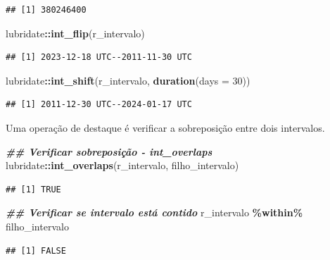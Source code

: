 \documentclass[
]{article}
\newenvironment{Shaded}{\begin{snugshade}}{\end{snugshade}}
\newcommand{\AttributeTok}[1]{\textcolor[rgb]{0.13,0.29,0.53}{#1}}
\newcommand{\DecValTok}[1]{\textcolor[rgb]{0.00,0.00,0.81}{#1}}
\newcommand{\DocumentationTok}[1]{\textcolor[rgb]{0.56,0.35,0.01}{\textbf{\textit{#1}}}}
\newcommand{\FunctionTok}[1]{\textcolor[rgb]{0.13,0.29,0.53}{\textbf{#1}}}
\newcommand{\NormalTok}[1]{#1}
\newcommand{\SpecialCharTok}[1]{\textcolor[rgb]{0.81,0.36,0.00}{\textbf{#1}}}
\begin{document}
\begin{verbatim}
## [1] 380246400
\end{verbatim}

\begin{Shaded}
\begin{Highlighting}[]
\NormalTok{lubridate}\SpecialCharTok{::}\FunctionTok{int\_flip}\NormalTok{(r\_intervalo)}
\end{Highlighting}
\end{Shaded}

\begin{verbatim}
## [1] 2023-12-18 UTC--2011-11-30 UTC
\end{verbatim}

\begin{Shaded}
\begin{Highlighting}[]
\NormalTok{lubridate}\SpecialCharTok{::}\FunctionTok{int\_shift}\NormalTok{(r\_intervalo, }\FunctionTok{duration}\NormalTok{(}\AttributeTok{days =} \DecValTok{30}\NormalTok{))}
\end{Highlighting}
\end{Shaded}

\begin{verbatim}
## [1] 2011-12-30 UTC--2024-01-17 UTC
\end{verbatim}

Uma operação de destaque é verificar a sobreposição entre dois intervalos.

\begin{Shaded}
\begin{Highlighting}[]
\DocumentationTok{\#\# Verificar sobreposição {-} int\_overlaps}
\NormalTok{lubridate}\SpecialCharTok{::}\FunctionTok{int\_overlaps}\NormalTok{(r\_intervalo, filho\_intervalo)}
\end{Highlighting}
\end{Shaded}

\begin{verbatim}
## [1] TRUE
\end{verbatim}

\begin{Shaded}
\begin{Highlighting}[]
\DocumentationTok{\#\# Verificar se intervalo está contido}
\NormalTok{r\_intervalo }\SpecialCharTok{\%within\%}\NormalTok{ filho\_intervalo}
\end{Highlighting}
\end{Shaded}

\begin{verbatim}
## [1] FALSE
\end{verbatim}
\end{document}
